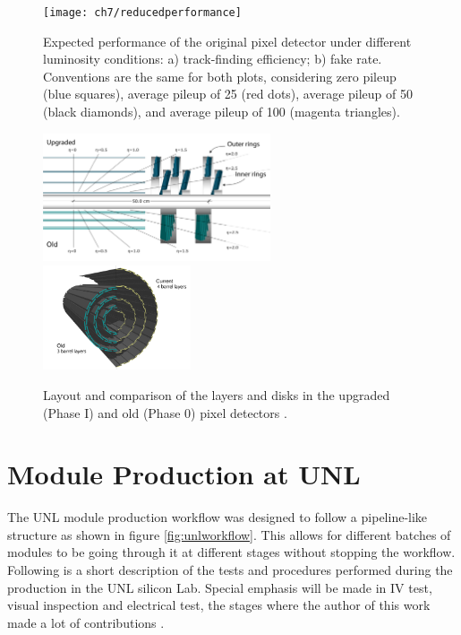 \begin{figure}[!h]
\centering
\texttt{[image: ch7/reducedperformance]}
\caption[Expected performance of the original pixel detector for different luminosities.]{Expected performance of the original pixel detector under different luminosity conditions: a) track-finding efficiency; b) fake rate. Conventions are the same for both plots, considering zero pileup (blue squares), average pileup of 25 (red dots), average pileup of 50 (black diamonds), and average pileup of 100 (magenta triangles).\cite{pix_tdr}}\label{fig:red_perf}
\end{figure}


\begin{figure}[!h]
\centering
\includegraphics[width=0.6\textwidth]{../images/ch7/fpix.pdf}
\includegraphics[width=0.39\textwidth]{../images/ch7/bpix.pdf}
\caption[Layout of the upgraded and old pixel detectors.]{Layout and comparison of the layers and disks in the upgraded (Phase I) and old (Phase 0) pixel detectors \cite{pix_tdr}.}\label{fig:new_pix}
\end{figure}


\section{Module Production at UNL}
The UNL module production workflow was designed to follow a pipeline-like structure as shown in figure \ref{fig:unlworkflow}. This allows for different batches of modules to be going through it at different stages without stopping the workflow. Following is a short description of the tests and procedures performed during the production in the UNL silicon Lab. Special emphasis will be made in IV test, visual inspection and electrical test, the stages where the author of this work made a lot of contributions {}. 

